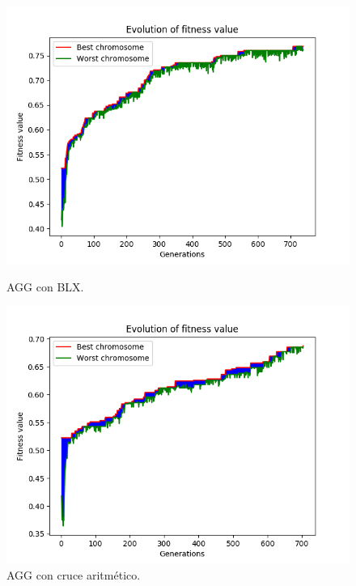 \documentclass[11pt,a4paper]{article}
\begin{document}
\begin{figure}[H]
\centering
\begin{minipage}{.5\textwidth}
	\centering
	\includegraphics[scale=0.43]{img/agg-blx-colposcopy.png}
	\caption{AGG con BLX.}
\end{minipage}%
\begin{minipage}{.5\textwidth}
	\centering
	\includegraphics[scale=0.43]{img/agg-ac-colposcopy.png}
	\caption{AGG con cruce aritmético.}
\end{minipage}
\end{figure}
\end{document}
